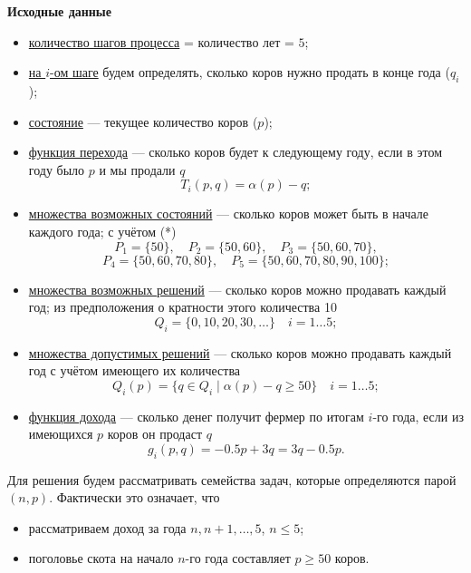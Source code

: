 \bigskip

\textbf{Исходные данные}

\begin{itemize}[nosep]
	\item \underline{количество шагов процесса} = количество лет = $5$;
	
	\item \underline{на $i$-ом шаге} будем определять, сколько коров нужно продать в конце года ($q_i$);
	
	\item \underline{состояние} --- текущее количество коров ($p$);
	
	\item \underline{функция перехода} --- сколько коров будет к следующему году, если в этом году было $p$ и мы продали $q$
	\[T_i(p, q) = \alpha(p) - q;\]
	
	\item \underline{множества возможных состояний} --- сколько коров может быть в начале каждого года; с учётом (*)
	\[
	P_1 = \{50\}, \quad P_2 = \{50, 60\}, \quad P_3 = \{50, 60, 70\},
	\]
	\[
	P_4 = \{50, 60, 70, 80\}, \quad P_5 = \{50, 60, 70, 80, 90, 100\};
	\]
	
	\item \underline{множества возможных решений} --- сколько коров можно продавать каждый год; из предположения о кратности этого количества 10
	\[
	Q_i = \{0, 10, 20, 30, \dots\} \quad i = 1 \dots 5;
	\]
	
	\item \underline{множества допустимых решений} --- сколько коров можно продавать каждый год с учётом имеющего их количества
	\[
	Q_i(p) = \{q \in Q_i \; \big| \; \alpha(p) - q \ge 50\} \quad i = 1 \dots 5;
	\]
	
	\item \underline{функция дохода} --- сколько денег получит фермер по итогам $i$-го года, если из имеющихся $p$ коров он продаст $q$
	\[g_i(p, q) = -0.5p + 3q = 3q - 0.5p.\]
\end{itemize}

Для решения будем рассматривать семейства задач, которые определяются парой $(n, p)$. Фактически это означает, что
\begin{itemize}[nosep]
	\item рассматриваем доход за года $n, n+1, \dots, 5$, $n \le 5$;
	
	\item поголовье скота на начало $n$-го года составляет $p \ge 50$ коров.
\end{itemize}

